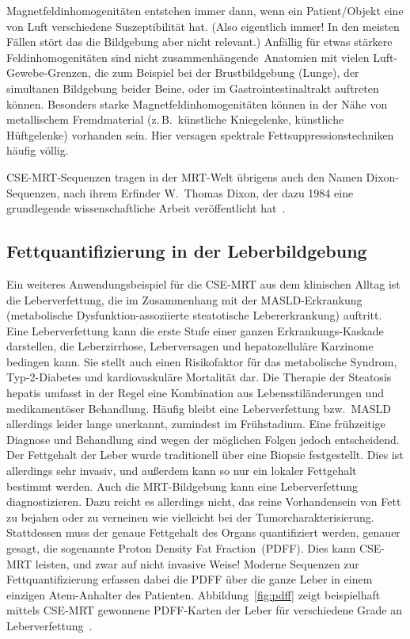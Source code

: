 \documentclass[a4paper,11pt]{article}
\begin{document}
Magnetfeldinhomogenitäten entstehen immer dann, wenn ein Patient/Objekt eine von Luft verschiedene Suszeptibilität hat. (Also eigentlich immer! In den meisten Fällen stört das die Bildgebung aber nicht relevant.) Anfällig für etwas stärkere Feldinhomogenitäten sind \glqq nicht zusammenhängende\grqq\ Anatomien mit vielen Luft-Gewebe-Grenzen, die zum Beispiel bei der Brustbildgebung (Lunge), der simultanen Bildgebung beider Beine, oder im Gastrointestinaltrakt auftreten können. Besonders starke Magnetfeldinhomogenitäten können in der Nähe von metallischem Fremdmaterial (z.\,B.\ künstliche Kniegelenke, künstliche Hüftgelenke) vorhanden sein. Hier versagen spektrale Fettsuppressionstechniken häufig völlig.

\begin{merke}
CSE-MRT-Sequenzen tragen in der MRT-Welt übrigens auch den Namen \glqq Dixon\grqq-Sequenzen, nach ihrem Erfinder W.~Thomas Dixon, der dazu 1984 eine grundlegende wissenschaftliche Arbeit veröffentlicht hat~\cite{dixon1984}.
\end{merke}

\subsection{Fettquantifizierung in der Leberbildgebung}
Ein weiteres Anwendungsbeispiel für die CSE-MRT aus dem klinischen Alltag ist die Leberverfettung, die im Zusammenhang mit der MASLD-Erkrankung (\glqq metabolische Dysfunktion-assoziierte steatotische Lebererkrankung\grqq) auftritt. Eine Leberverfettung kann die erste Stufe einer ganzen Erkrankungs-Kaskade darstellen, die Leberzirrhose, Leberversagen und hepatozelluläre Karzinome bedingen kann. Sie stellt auch einen Risikofaktor für das metabolische Syndrom, Typ-2-Diabetes und kardiovaskuläre Mortalität dar. Die Therapie der Steatosis hepatis umfasst in der Regel eine Kombination aus Lebensstiländerungen und medikamentöser Behandlung. Häufig bleibt eine Leberverfettung bzw.\ MASLD allerdings leider lange unerkannt, zumindest im Frühstadium. Eine frühzeitige Diagnose und Behandlung sind wegen der möglichen Folgen jedoch entscheidend. Der Fettgehalt der Leber wurde traditionell über eine Biopsie festgestellt. Dies ist allerdings sehr invasiv, und außerdem kann so nur ein lokaler Fettgehalt bestimmt werden. Auch die MRT-Bildgebung kann eine Leberverfettung diagnostizieren. Dazu reicht es allerdings nicht, das reine Vorhandensein von Fett zu bejahen oder zu verneinen wie vielleicht bei der Tumorcharakterisierung. Stattdessen muss der genaue Fettgehalt des Organs quantifiziert werden, genauer gesagt, die sogenannte \glqq Proton Density Fat Fraction\grqq\ (PDFF). Dies kann CSE-MRT leisten, und zwar auf nicht invasive Weise! Moderne Sequenzen zur Fettquantifizierung erfassen dabei die PDFF über die ganze Leber in einem einzigen Atem-Anhalter des Patienten. Abbildung~\ref{fig:pdff} zeigt beispielhaft mittels CSE-MRT gewonnene PDFF-Karten der Leber für verschiedene Grade an Leberverfettung~\cite{starekova2021}.
\end{document}
